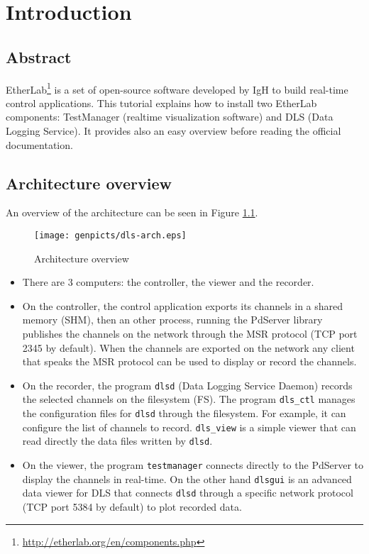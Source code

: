 \chapter{Introduction}


\section{Abstract}
EtherLab\footnote{ \url{http://etherlab.org/en/components.php}} is a
set of open-source software developed by IgH to build real-time
control applications. This tutorial explains how to install two
EtherLab components: TestManager (realtime visualization software) and
DLS (Data Logging Service). It provides also an easy overview
before reading the official documentation.

\section{Architecture overview}
An overview of the architecture can be seen in Figure \ref{fig:architecture}.

\begin{figure}[h!]
  \texttt{[image: genpicts/dls-arch.eps]}
  \caption{Architecture overview}
  \label{fig:architecture}
\end{figure}


\begin{itemize}

\item There are 3 computers: the controller, the viewer and the recorder.

\item On the controller, the control application exports its
  channels in a shared memory (SHM), then an other process, running
  the PdServer library publishes the channels on the network through the MSR
  protocol (TCP port 2345 by default).
  When the channels are exported on the network any client that
  speaks the MSR protocol can be used to display or record the
  channels.

\item On the recorder, the program \texttt{dlsd} (Data Logging Service
  Daemon) records the selected channels on the filesystem (FS).  The
  program \texttt{dls\_ctl} manages the configuration files for
  \texttt{dlsd} through the filesystem. For example, it can configure
  the list of channels to record.
  \texttt{dls\_view} is a simple viewer that can read directly
  the data files written by \texttt{dlsd}.

\item On the viewer, the program \texttt{testmanager} connects
  directly to the PdServer to display the channels in real-time.  On
  the other hand \texttt{dlsgui} is an advanced data viewer for DLS
  that connects \texttt{dlsd} through a specific network protocol (TCP
  port 5384 by default) to plot recorded data.

\end{itemize}

